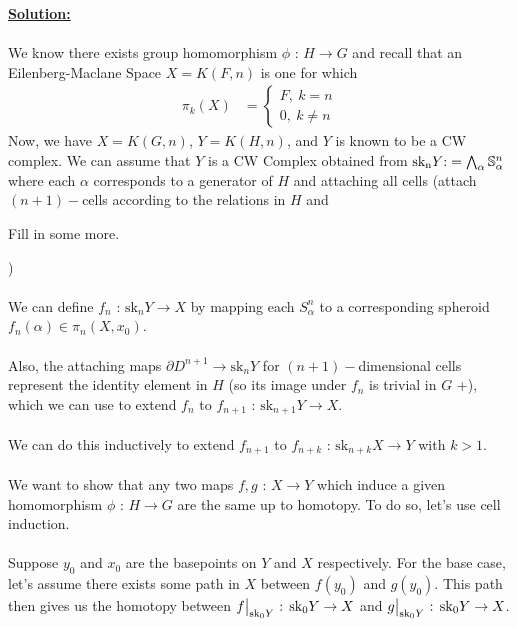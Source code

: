 \documentclass[11pt]{article}
\begin{document}
\vskip 0.5cm
\textbf{\underline{Solution:}}
\\
\\
We know there exists group homomorphism $\phi \text{ : } H \rightarrow G$ and recall that an Eilenberg-Maclane Space $X = K(F, n)$ is one for which
\begin{align*}
  \pi_k(X) &= \begin{cases}
    F,~ k = n \\
    0,~ k \neq n
  \end{cases}
\end{align*}
Now, we have $X = K(G, n)$, $Y = K(H, n)$, and $Y$ is known to be a CW complex. We can assume that $Y$ is a CW Complex obtained from $\mathrm{sk_n} Y \text{:}= \bigwedge_{\alpha} \mathbb{S}^n_{\alpha}$ where each $\alpha$ corresponds to a generator of $H$ and attaching all cells (attach $(n+1)-$cells according to the relations in $H$ and \begin{note}{Fill in some more.}\end{note})
\\
\\
We can define $f_n \text{ : } \mathrm{sk}_n Y \rightarrow X $ by mapping each $S_{\alpha}^{n}$ to a corresponding spheroid $f_n(\alpha) \in \pi_n(X, x_0)$.
\\
\\
Also, the attaching maps $\partial D^{n+1} \rightarrow \mathrm{sk}_n Y$ for $(n+1)-$dimensional cells represent the identity element in $H$ (so its image under $f_n$ is trivial in $G$
+), which we can use to extend $f_n$ to $f_{n+1} \text{ : } \mathrm{sk}_{n+1} Y \rightarrow X$. 
\\
\\
We can do this inductively to extend $f_{n+1}$ to $f_{n+k} \text{ : } \mathrm{sk}_{n+k} X \rightarrow Y$ with $k > 1$.
\\
\\
We want to show that any two maps $f, g \text{ : } X \rightarrow Y$ which induce a given homomorphism $\phi \text{ : } H \rightarrow G$ are the same up to homotopy. To do so, let's use cell induction.
\\
\\
Suppose $y_0$ and $x_0$ are the basepoints on $Y$ and $X$ respectively. For the base case, let's assume there exists some path in $X$ between $f(y_0)$ and $g(y_0)$. This path then gives us the homotopy between $\restr{f}{\mathrm{sk}_0  Y} \text{ : } \mathrm{sk}_0 Y \rightarrow X$ and $\restr{g}{\mathrm{sk}_0 Y} \text{ : } \mathrm{sk}_0 Y \rightarrow X$.
\\
\end{document}
